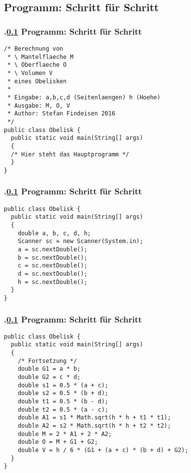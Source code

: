\def\stitle{Programm: Schritt für Schritt}%
\subsection{\stitle}\label{S:Code}
\begin{frame}[fragile]%
    \frametitle{\kap.\ref{S:Code} \stitle}%

\begin{lstlisting}[style=java,title={Programmgerüst.}]
/* Berechnung von
 * \ Mantelflaeche M
 * \ Oberflaeche O
 * \ Volumen V
 * eines Obelisken
 *
 * Eingabe: a,b,c,d (Seitenlaengen) h (Hoehe)
 * Ausgabe: M, O, V
 * Author: Stefan Findeisen 2016
 */
public class Obelisk {
  public static void main(String[] args)
  {
  /* Hier steht das Hauptprogramm */
  }
}
\end{lstlisting}
\end{frame}


\begin{frame}[fragile]%
    \frametitle{\kap.\ref{S:Code} \stitle}%

\begin{lstlisting}[style=java, title={Lese Seitenlängen und Höhe ein.}]
public class Obelisk {
  public static void main(String[] args)
  {
    double a, b, c, d, h;
    Scanner sc = new Scanner(System.in);
    a = sc.nextDouble();
    b = sc.nextDouble();
    c = sc.nextDouble();
    d = sc.nextDouble();
    h = sc.nextDouble();
  }
}
\end{lstlisting}
\end{frame}


\begin{frame}[fragile]%
    \frametitle{\kap.\ref{S:Code} \stitle}%

\begin{lstlisting}[style=java, title={Berechne Hilfsvariablen.}]
public class Obelisk {
  public static void main(String[] args)
  {
    /* Fortsetzung */
    double G1 = a * b;
    double G2 = c * d;
    double s1 = 0.5 * (a + c);
    double s2 = 0.5 * (b + d);
    double t1 = 0.5 * (b - d);
    double t2 = 0.5 * (a - c);
    double A1 = s1 * Math.sqrt(h * h + t1 * t1);
    double A2 = s2 * Math.sqrt(h * h + t2 * t2);
    double M = 2 * A1 + 2 * A2;
    double O = M + G1 + G2;
    double V = h / 6 * (G1 + (a + c) * (b + d) + G2);
  }
}
\end{lstlisting}
\end{frame}
